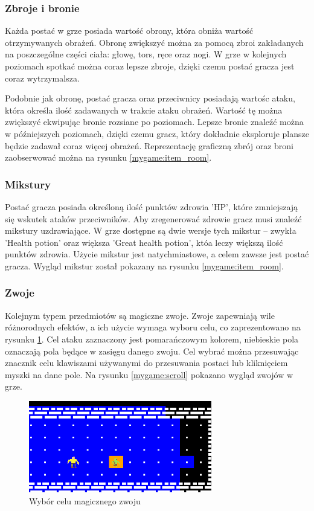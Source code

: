 \documentclass[12pt,twoside]{article}
\begin{document}
\subsubsection{Zbroje i bronie}
Każda postać w grze posiada wartość obrony, która obniża wartość otrzymywanych obrażeń. Obronę zwiększyć można za pomocą zbroi zakładanych na poszczególne części ciała: głowę, tors, ręce oraz nogi. W grze w kolejnych poziomach spotkać można coraz lepsze zbroje, dzięki czemu postać gracza jest coraz wytrzymalsza.

Podobnie jak obronę, postać gracza oraz przeciwnicy posiadają wartośc ataku, która określa ilość zadawanych w trakcie ataku obrażeń. Wartość tę można zwiększyć ekwipując bronie rozsiane po poziomach. Lepsze bronie znaleźć można w późniejszych poziomach, dzięki czemu gracz, który dokładnie eksploruje plansze będzie zadawał coraz więcej obrażeń. Reprezentację graficzną zbrój oraz broni zaobserwować można na rysunku \ref{mygame:item_room}.


\subsubsection{Mikstury}
Postać gracza posiada określoną ilość punktów zdrowia 'HP', które zmniejszają się wskutek ataków przeciwników. Aby zregenerować zdrowie gracz musi znaleźć mikstury uzdrawiające. W grze dostępne są dwie wersje tych mikstur -- zwykła 'Health potion' oraz większa 'Great health potion', któa leczy większą ilość punktów zdrowia. Użycie mikstur jest natychmiastowe, a celem zawsze jest postać gracza. Wygląd mikstur został pokazany na rysunku \ref{mygame:item_room}.


\subsubsection{Zwoje}
Kolejnym typem przedmiotów są magiczne zwoje. Zwoje zapewniają wile różnorodnych efektów, a ich użycie wymaga wyboru celu, co zaprezentowano na rysunku \ref{mygame:targeting}. Cel ataku zaznaczony jest pomarańczowym kolorem, niebieskie pola oznaczają pola będące w zasięgu danego zwoju. Cel wybrać można przesuwając znacznik celu klawiszami używanymi do przesuwania postaci lub kliknięciem myszki na dane pole. Na rysunku \ref{mygame:scroll} pokazano wygląd zwojów w grze.

\FloatBarrier
\begin{figure}[h]
	\centering
	\includegraphics[width=8cm]{images/mygame/targeting.png}
	\caption{Wybór celu magicznego zwoju}
	\label{mygame:targeting}
\end{figure}
\FloatBarrier
\end{document}
